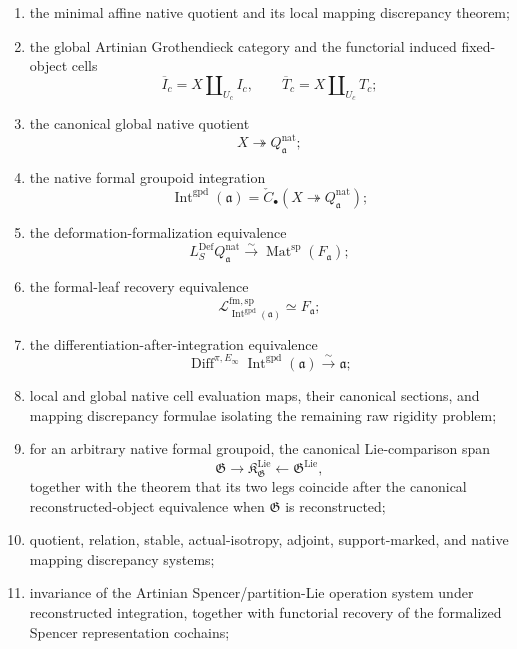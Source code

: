 \begin{theorem}
\begin{enumerate}
    \item the minimal affine native quotient and its local mapping discrepancy
    theorem;
    \item the global Artinian Grothendieck category and the functorial induced
    fixed-object cells
    \[
        \overline I_c=X\amalg_{U_c}I_c,
        \qquad
        \overline T_c=X\amalg_{U_c}T_c;
    \]
    \item the canonical global native quotient
    \[
        X\twoheadrightarrow Q^{\mathrm{nat}}_{\mathfrak a};
    \]
    \item the native formal groupoid integration
    \[
\boxed{
        \operatorname{Int}^{\mathrm{gpd}}(\mathfrak a)
        =
        \check C_\bullet
        \left(
          X\twoheadrightarrow Q^{\mathrm{nat}}_{\mathfrak a}
        \right);}
    \]
    \item the deformation-formalization equivalence
    \[
        L_S^{\mathrm{Def}}Q^{\mathrm{nat}}_{\mathfrak a}
        \xrightarrow{\sim}
        \operatorname{Mat}^{\mathrm{sp}}(F_{\mathfrak a});
    \]
    \item the formal-leaf recovery equivalence
    \[
        \mathcal L^{\mathrm{fm,sp}}_{
        \operatorname{Int}^{\mathrm{gpd}}(\mathfrak a)}
        \simeq
        F_{\mathfrak a};
    \]
    \item the differentiation-after-integration equivalence
    \[
        \operatorname{Diff}^{\pi,E_\infty}
        \operatorname{Int}^{\mathrm{gpd}}(\mathfrak a)
        \xrightarrow{\sim}
        \mathfrak a;
    \]
    \item local and global native cell evaluation maps, their canonical
    sections, and mapping discrepancy formulae isolating the remaining raw
    rigidity problem;
    \item for an arbitrary native formal groupoid, the canonical Lie-comparison
    span
    \[
        \mathfrak G
        \longrightarrow
        \mathfrak K^{\mathrm{Lie}}_{\mathfrak G}
        \longleftarrow
        \mathfrak G^{\mathrm{Lie}},
    \]
    together with the theorem that its two legs coincide after the canonical
    reconstructed-object equivalence when $\mathfrak G$ is reconstructed;
    \item quotient, relation, stable, actual-isotropy, adjoint,
    support-marked, and native mapping discrepancy systems;
    \item invariance of the Artinian Spencer/partition-Lie operation system
    under reconstructed integration, together with functorial recovery of the
    formalized Spencer representation cochains;

\end{enumerate}
\end{theorem}
